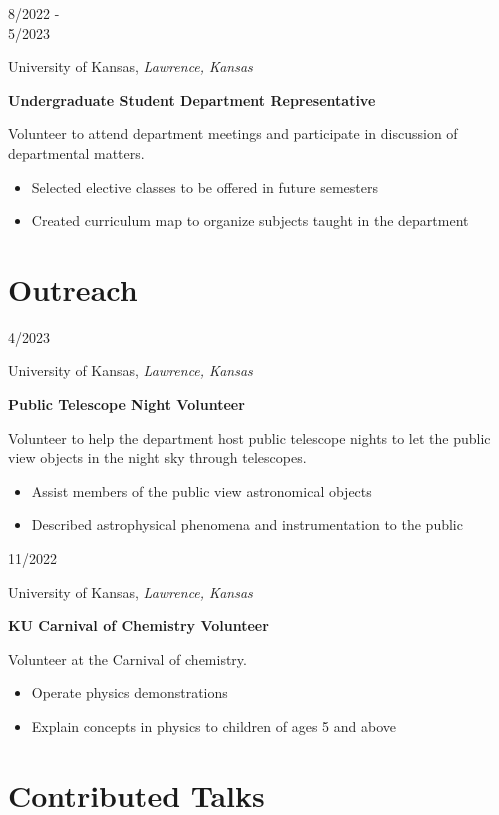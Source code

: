 \documentclass[12pt]{article}
\newenvironment{entry}[4]{
  \medskip
  \begin{minipage}[t]{0.75in}
    #3
  \end{minipage}
  \begin{minipage}[t]{\dimexpr\textwidth-0.75in}
    #1, \textit{#2}

    \textbf{#4}
    
    \smallskip
}{
  \end{minipage}
}
\begin{document}
\begin{entry}{University of Kansas}{Lawrence, Kansas}{8/2022 -\\ 5/2023}{Undergraduate Student Department Representative}
  Volunteer to attend department meetings and participate in discussion of
  departmental matters.
  \begin{itemize}
    \item Selected elective classes to be offered in future semesters
    \item Created curriculum map to organize subjects taught in the department
  \end{itemize}  
\end{entry}

\section*{Outreach}\vspace{-1ex}

\begin{entry}{University of Kansas}{Lawrence, Kansas}{4/2023}{Public Telescope Night Volunteer}
  Volunteer to help the department host public telescope nights to let the
  public view objects in the night sky through telescopes.
  \begin{itemize}
    \item Assist members of the public view astronomical objects
    \item Described astrophysical phenomena and instrumentation to the public
  \end{itemize}
\end{entry}

\begin{entry}{University of Kansas}{Lawrence, Kansas}{11/2022}{KU Carnival of Chemistry Volunteer}
  Volunteer at the Carnival of chemistry.
  \begin{itemize}
    \item Operate physics demonstrations
    \item Explain concepts in physics to children of ages 5 and above
  \end{itemize}
\end{entry}

\section*{Contributed Talks}\vspace{-1ex}

\newcommand{\talk}[4]{
  \medskip
  \begin{minipage}[t]{0.75in}
    #3
  \end{minipage}
  \begin{minipage}[t]{\dimexpr\textwidth-0.75in}
    \textbf{#1}, \textit{#2}\\
    #4
  \end{minipage}  
}
\end{document}
